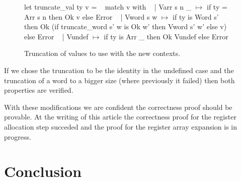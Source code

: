 \documentclass{article}
\begin{document}
\begin{figure}[t]
\obeylines\obeyspaces\ttfamily%
let truncate\_val ty v =
~ match v with
~ | Varr s n \_ \(\mapsto\) if ty = Arr s n then Ok v else Error
~ | Vword s w  \(\mapsto\) if ty is Word s'
~   then Ok (if truncate\_word s' w is Ok w' then Vword s' w' else v) else Error
~ | Vundef     \(\mapsto\) if ty is Arr \_ then Ok Vundef else Error
\normalfont%
\caption{Truncation of values to use with the new contexts.}
\end{figure}

If we chose the truncation to be the identity in the undefined case and the
truncation of a word to a bigger size (where previously it failed) then both
properties are verified.

\medskip

With these modifications we are confident the correctness proof should be
provable. At the writing of this article the correctness proof for the register
allocation step succeded and the proof for the register array expansion is in
progress.

\section{Conclusion}\label{sec:ccl}
\end{document}

